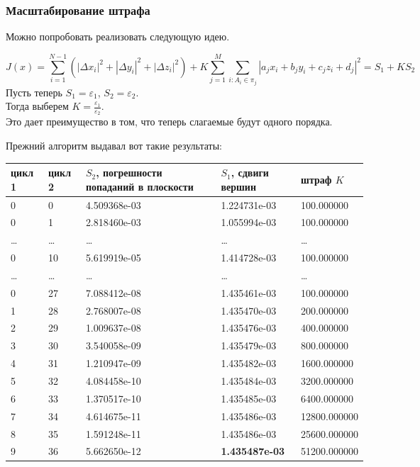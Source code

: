 \documentclass[a4paper,12pt, titlepage]{article}
\begin{document}
\subsubsection{Масштабирование штрафа}
\begin{flushleft}
 Можно попробовать реализовать следующую идею.
\end{flushleft}
\begin{flushleft}
$$	
	J(x) = \sum\limits_{i = 1}^{N - 1}(|\Delta x_{i}|^{2} + |\Delta y_{i}|^{2} + |\Delta z_{i}|^{2}) + 
	K\sum\limits_{j = 1}^{M}\sum\limits_{i: A_{i} \in \pi_{j}}
	|a_{j}x_{i} + b_{j}y_{i} + c_{j}z_{i} + d_{j}|^{2}  = 
	S_{1} + K S_{2}
$$
Пусть теперь $S_{1} = \varepsilon_{1}$, $S_{2} = \varepsilon_{2}$.\\
Тогда выберем $K = \frac{\varepsilon_{1}}{\varepsilon_{2}}$.\\
Это дает преимущество в том, что теперь слагаемые будут одного порядка.
\end{flushleft}
\begin{flushleft}
 Прежний алгоритм выдавал вот такие результаты: 
\end{flushleft}

\begin{flushleft}
\begin{tabular}{|p{1cm}|p{1cm}|p{4cm}|p{4cm}|p{3cm}|}

\hline 
 цикл 1 & цикл 2 & $S_{2}$, погрешности попаданий в плоскости & $S_{1}$, сдвиги вершин& штраф $K$ \\
\hline
 0 & 0 & 4.509368e-03 & 1.224731e-03 & 100.000000\\
\hline
 0 & 1 & 2.818460e-03 & 1.055994e-03 & 100.000000\\
\hline
 \dots & \dots & \dots & \dots & \dots\\
\hline
 0 & 10 & 5.619919e-05 & 1.414728e-03 & 100.000000\\
\hline
 \dots & \dots & \dots & \dots & \dots\\
\hline
 0 & 27 & 7.088412e-08 & 1.435461e-03 & 100.000000\\
\hline
 1 & 28 & 2.768007e-08 & 1.435470e-03 & 200.000000\\
\hline
 2 & 29 & 1.009637e-08 & 1.435476e-03 & 400.000000\\
\hline
 3 & 30 & 3.540058e-09 & 1.435479e-03 & 800.000000\\
\hline
 4 & 31 & 1.210947e-09 & 1.435482e-03 & 1600.000000\\
\hline
 5 & 32 & 4.084458e-10 & 1.435484e-03 & 3200.000000\\
\hline
 6 & 33 & 1.370517e-10 & 1.435485e-03 & 6400.000000\\
\hline
 7 & 34 & 4.614675e-11 & 1.435486e-03 & 12800.000000\\
\hline
 8 & 35 & 1.591248e-11 & 1.435486e-03 & 25600.000000\\
\hline
 9 & 36 & 5.662650e-12 & \textbf{1.435487e-03} & 51200.000000\\
\hline
\end{tabular}
\end{flushleft}
\end{document}
